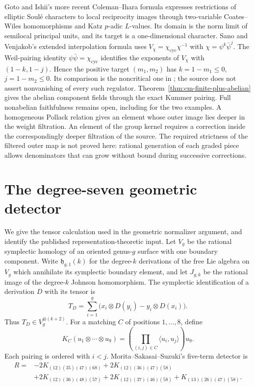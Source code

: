 \documentclass[11pt]{article}
\theoremstyle{definition}\newtheorem{definition}[theorem]{Definition}
\begin{document}
Goto and Ishii's more recent Coleman--Ihara formula
\cite[Theorem 1.1 and Corollary 5.5]{GotoIshii2026}
expresses restrictions of elliptic Soul\'e characters to local
reciprocity images through two-variable Coates--Wiles
homomorphisms and Katz \(p\)-adic \(L\)-values. Its domain is the
norm limit of semilocal principal units, and its target is a
one-dimensional character. Sano and Venjakob's extended
interpolation formula
\cite[Theorem 1.2.1, p.~3, and Theorem 2.4.1, p.~8]{SanoVenjakob2026}
uses \(V_\chi=\chi_{\mathrm{cyc}}\chi^{-1}\) with
\(\chi=\psi^k\bar\psi^j\). The Weil-pairing identity
\(\psi\bar\psi=\chi_{\mathrm{cyc}}\) identifies the exponents of
\(V_\chi\) with \((1-k,1-j)\). Hence the positive target
\((m_1,m_2)\) has \(k=1-m_1\leq0\), \(j=1-m_2\leq0\).
Its comparison is the noncritical one in
\cite[Corollary 2.4.7, pp.~9--10]{SanoVenjakob2026};
the source does not assert nonvanishing of every such regulator.
Theorem~\ref{thm:cm-finite-plus-abelian} gives the abelian component
fields through the exact Kummer pairing. Full nonabelian faithfulness
remains open, including for the two examples. A homogeneous Pollack
relation gives an element whose outer image lies deeper in the
weight filtration. An element of the group kernel requires a correction
inside the correspondingly deeper filtration of the source. The required
strictness of the filtered outer map is not proved here: rational
generation of each graded piece allows denominators that can grow
without bound during successive corrections.

\section{The degree-seven geometric detector}
\label{sec:geometric-detector}

We give the tensor calculation used in the geometric normalizer
argument, and identify the published representation-theoretic input.
Let $V_g$ be the rational symplectic homology of an oriented genus-$g$
surface with one boundary component. Write $\mathfrak h_{g,1}(k)$
for the degree-$k$ derivations of the free Lie algebra on $V_g$
which annihilate its symplectic boundary element, and let
$J_{g,k}$ be the rational image of the degree-$k$ Johnson homomorphism.
The symplectic identification of a derivation $D$ with its tensor is
\[
 T_D=\sum_{i=1}^g\bigl(x_i\otimes D(y_i)-y_i\otimes D(x_i)\bigr).
\]
Thus $T_D\in V_g^{\otimes(k+2)}$.
For a matching $C$ of positions $1,\ldots,8$, define
\[
 K_C(u_1\otimes\cdots\otimes u_9)
  =\left(\prod_{(i,j)\in C}\langle u_i,u_j\rangle\right)u_9.
\]
Each pairing is ordered with $i<j$.
Morita--Sakasai--Suzuki's five-term detector
\cite[Proposition~4.1, p.~11]{MSS2026} is
\begin{align*}
 R={}&-2K_{(12)(35)(47)(68)}
       +2K_{(12)(36)(47)(58)}\\
    &+2K_{(12)(36)(48)(57)}
       +2K_{(12)(37)(46)(58)}
       +K_{(13)(26)(47)(58)}.
\end{align*}
\end{document}
